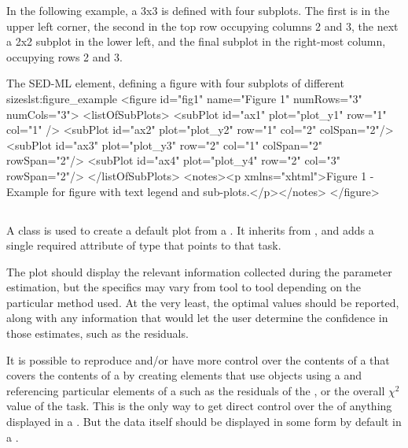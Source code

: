 \begin{blockChanged}
In the following example, a 3x3 \Figure is defined with four subplots.  The first is in the upper left corner, the second in the top row occupying columns 2 and 3, the next a 2x2 subplot in the lower left, and the final subplot in the right-most column, occupying rows 2 and 3.

\begin{myXmlLst}{The SED-ML  element, defining a figure with four subplots of different sizes}{lst:figure_example}
<figure id="fig1" name="Figure 1" numRows="3" numCols="3">
    <listOfSubPlots>
        <subPlot id="ax1" plot="plot_y1" row="1" col="1" />
        <subPlot id="ax2" plot="plot_y2" row="1" col="2" colSpan="2"/>
        <subPlot id="ax3" plot="plot_y3" row="2" col="1" colSpan="2" rowSpan="2"/>
        <subPlot id="ax4" plot="plot_y4" row="2" col="3" rowSpan="2"/>
    </listOfSubPlots>
    <notes><p xmlns="xhtml">Figure 1 - Example for figure with text legend and sub-plots.</p></notes>
</figure>
\end{myXmlLst}



\subsection{}
\label{class:parameterEstimationResultPlot}
A \ParameterEstimationResultPlot class is used to create a default plot from a \ParameterEstimationTask.  It inherits from \Plot, and adds a single required attribute  of type \SIdRef that points to that task.


The plot should display the relevant information collected during the parameter estimation, but the specifics may vary from tool to tool depending on the particular method used.  At the very least, the optimal \AdjustableParameter values should be reported, along with any information that would let the user determine the confidence in those estimates, such as the residuals.

It is possible to reproduce and/or have more control over the contents of a \Plot that covers the contents of a \ParameterEstimationTask by creating \DataGenerator elements that use \Variable objects using a  and referencing particular elements of a \ParameterEstimationTask such as the residuals of the \Objective, or the overall $\chi^2$ value of the task.  This is the only way to get direct control over the \Style of anything displayed in a \ParameterEstimationResultPlot.  But the data itself should be displayed in some form by default in a \ParameterEstimationReport.



\end{blockChanged}
